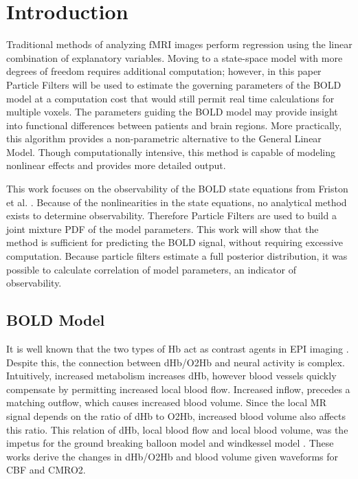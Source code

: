 \documentclass{article}
\begin{document}
\section{Introduction}
\label{sec:intro}
Traditional methods of analyzing 
\ac{fMRI} images perform regression using the linear combination of explanatory variables. 
Moving to a state-space model with more degrees of freedom 
requires additional computation; however, in this paper Particle Filters will
be used to estimate the governing parameters of the \ac{BOLD} model 
at a computation cost 
that would still permit real time calculations for multiple voxels.
The parameters guiding the BOLD model may provide insight into 
functional differences between patients and brain regions.
More practically, this algorithm provides a non-parametric
alternative to the General Linear Model. Though computationally intensive,
this method is capable of modeling nonlinear effects
and provides more detailed output. 

This work focuses
on the observability of the \ac{BOLD} state equations from Friston et al.
\cite{Friston2000}. 
Because of the nonlinearities in the state equations,
no analytical method exists to determine observability. Therefore
Particle Filters are used to build a joint mixture \ac{PDF} of the model parameters. 
This work will show that the method is sufficient for predicting
the BOLD signal, without requiring excessive computation. 
Because particle filters estimate a full posterior distribution, 
it was possible to calculate correlation of model parameters, an
indicator of observability. 

\subsection{BOLD Model}
It is well known that the two types of \ac{Hb} act as contrast agents in 
\ac{EPI} imaging \cite{Buxton1998, WEISSKOFF1994, Ogawa}. Despite this, the connection
between \ac{dHb}/\ac{O2Hb} and neural activity is complex. 
Intuitively, increased 
metabolism increases \ac{dHb}, however blood vessels quickly
compensate by permitting increased local blood flow. Increased inflow, 
precedes a matching outflow, which causes increased blood volume.
Since the local \ac{MR} signal depends on the ratio of \ac{dHb} to \ac{O2Hb},
increased blood volume also affects this ratio. 
This relation of \ac{dHb}, local blood flow and local blood volume,
was the impetus
for the ground breaking balloon model \cite{Buxton1998} and windkessel
model \cite{Mandeville1999}. These works derive 
the changes in \ac{dHb}/\ac{O2Hb} and blood volume given waveforms for \ac{CBF}
and \ac{CMRO2}.
\end{document}
